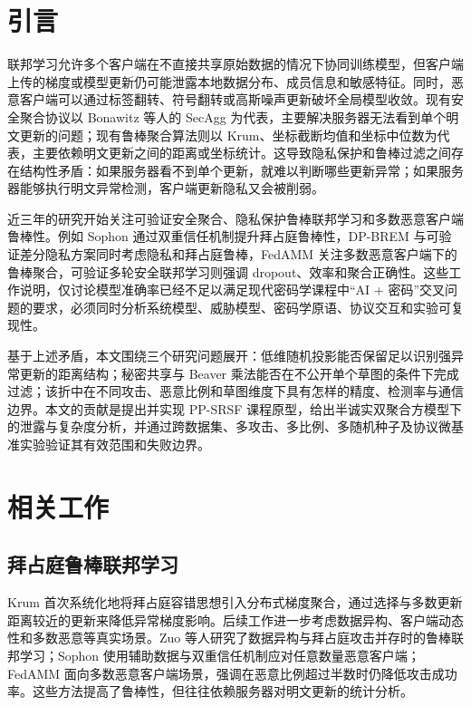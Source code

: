 \documentclass[final]{jcr}
\begin{document}

\section{引言}
联邦学习允许多个客户端在不直接共享原始数据的情况下协同训练模型，但客户端上传的梯度或模型更新仍可能泄露本地数据分布、成员信息和敏感特征。同时，恶意客户端可以通过标签翻转、符号翻转或高斯噪声更新破坏全局模型收敛。现有安全聚合协议以 Bonawitz 等人的 SecAgg 为代表，主要解决服务器无法看到单个明文更新的问题\cite{bonawitz2017secagg}；现有鲁棒聚合算法则以 Krum、坐标截断均值和坐标中位数为代表，主要依赖明文更新之间的距离或坐标统计\cite{blanchard2017krum}。这导致隐私保护和鲁棒过滤之间存在结构性矛盾：如果服务器看不到单个更新，就难以判断哪些更新异常；如果服务器能够执行明文异常检测，客户端更新隐私又会被削弱。

近三年的研究开始关注可验证安全聚合、隐私保护鲁棒联邦学习和多数恶意客户端鲁棒性。例如 Sophon 通过双重信任机制提升拜占庭鲁棒性\cite{sophon2025}，DP-BREM 与可验证差分隐私方案同时考虑隐私和拜占庭鲁棒\cite{gu2025dpbrem,zhang2025verifiabledp}，FedAMM 关注多数恶意客户端下的鲁棒聚合\cite{fedamm2025}，可验证多轮安全联邦学习则强调 dropout、效率和聚合正确性\cite{li2026verifiable}。这些工作说明，仅讨论模型准确率已经不足以满足现代密码学课程中“AI + 密码”交叉问题的要求，必须同时分析系统模型、威胁模型、密码学原语、协议交互和实验可复现性。

基于上述矛盾，本文围绕三个研究问题展开：低维随机投影能否保留足以识别强异常更新的距离结构；秘密共享与 Beaver 乘法能否在不公开单个草图的条件下完成过滤；该折中在不同攻击、恶意比例和草图维度下具有怎样的精度、检测率与通信边界。本文的贡献是提出并实现 PP-SRSF 课程原型，给出半诚实双聚合方模型下的泄露与复杂度分析，并通过跨数据集、多攻击、多比例、多随机种子及协议微基准实验验证其有效范围和失败边界。

\section{相关工作}
\subsection{拜占庭鲁棒联邦学习}
Krum 首次系统化地将拜占庭容错思想引入分布式梯度聚合，通过选择与多数更新距离较近的更新来降低异常梯度影响\cite{blanchard2017krum}。后续工作进一步考虑数据异构、客户端动态性和多数恶意等真实场景。Zuo 等人研究了数据异构与拜占庭攻击并存时的鲁棒联邦学习\cite{zuo2025heterogeneity}；Sophon 使用辅助数据与双重信任机制应对任意数量恶意客户端\cite{sophon2025}；FedAMM 面向多数恶意客户端场景，强调在恶意比例超过半数时仍降低攻击成功率\cite{fedamm2025}。这些方法提高了鲁棒性，但往往依赖服务器对明文更新的统计分析。
\end{document}

